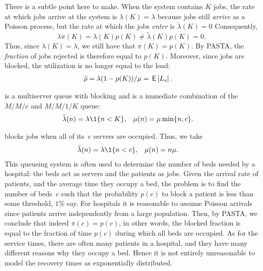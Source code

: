 \documentclass[stochastic-or.tex]{subfiles}
\begin{document}
There is a subtle point here to make.
When the system contains $K$ jobs, the rate at which jobs arrive at the system is $\lambda (K) = \lambda$ because jobs still \emph{arrive} as a Poisson process, but the rate at which the jobs \emph{enter} is $\tilde \lambda(K)= 0$ Consequently,
\begin{equation*}
\lambda \pi(K) = \lambda(K) p(K) \neq \tilde \lambda(K) p(K) = 0.
\end{equation*}
Thus, since $\lambda(K) = \lambda$,  we still have that $\pi(K) = p(K)$. By PASTA, the \emph{fraction} of jobs rejected is therefore equal to $p(K)$.
Moreover, since jobs are blocked, the utilization is no longer equal to the load:
\begin{align}\label{eq:mm1-2}
\tilde \rho &= \lambda (1-p(K))/\mu = \,\mathsf{E}\left[L_s\right].
\end{align}


 is a multiserver queue with blocking and is a immediate combination of the $M/M/c$ and $M/M/1/K$ queue:
\begin{align*}
\tilde \lambda(n) &= \lambda\1{n<K}, &\mu(n) &= \mu \min\{n, c\}.
\end{align*}

 blocks jobs when all of its~$c$ servers are occupied.
Thus, we take
\begin{align*}
\tilde \lambda(n) &= \lambda\1{n<c}, & \mu(n) &= n \mu.
 \end{align*}
This queueing system is often used to determine the number of beds needed by a hospital: the beds act as servers and the patients as jobs.
Given the arrival rate of patients, and the average time they occupy a bed, the problem is to find the number of beds~$c$ such that the probability $p(c)$ to block a patient is less than some threshold, $1\%$ say.
For hospitals it is reasonable to assume Poisson arrivals since patients arrive independently from a large population.
Then, by PASTA, we conclude that indeed $\pi(c) = p(c)$, in other words, the blocked fraction is equal to the fraction of time $p(c)$ during which all beds are occupied.
As for the service times, there are often many patients in a hospital, and they have many different reasons why they occupy a bed.
Hence it is not entirely unreasonable to model the recovery times as exponentially distributed.
\end{document}
